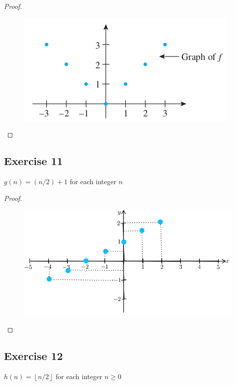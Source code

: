 \documentclass[14pt]{extarticle}
\newcommand{\floor}[1]{{\left\lfloor#1\right\rfloor}}
\begin{document}
\begin{proof}
\begin{figure}[ht!]
\centering
\includegraphics[scale=0.5]{../images/11.1.10.png}
\end{figure}
\end{proof}

\subsection{Exercise 11}
\(g(n) = (n/2) + 1\) for each integer \(n\)

\begin{proof}
\begin{figure}[ht!]
\centering
\includegraphics[scale=0.5]{../images/11.1.11.png}
\end{figure}
\end{proof}

\subsection{Exercise 12}
\(h(n) = \floor{n/2}\) for each integer \(n \geq 0\)
\end{document}
